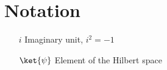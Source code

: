 \chapter{Notation}
\begin{enumerate}
    \item[$i$] Imaginary unit, $i^2 = -1$
    \item[$\ket{\psi}$] Element of the Hilbert space   
\end{enumerate}